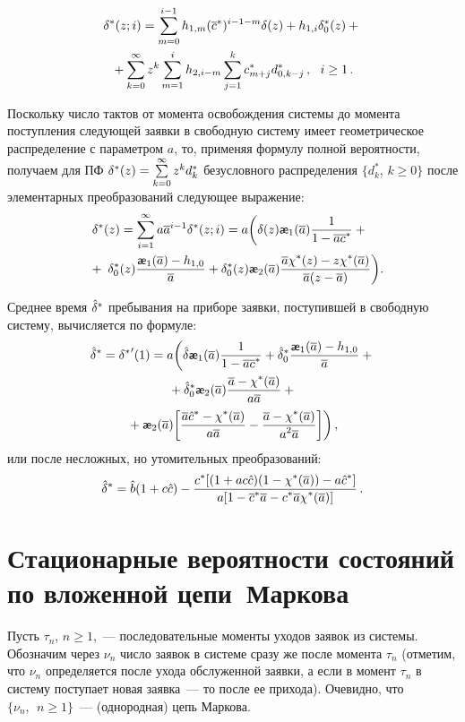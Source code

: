 \begin{multicols}{2}
\noindent
\begin{multline*}
\delta^*(z;i)= \sum_{m=0}^{i-1} h_{1,m} (\overline c^*)^{i-1-m} \delta(z)
+ h_{1,i} \delta^*_{0}(z) +{}\\
{}+ \sum_{k=0}^{\infty} z^k \sum_{m=1}^{i} h_{2,i-m}
\sum_{j=1}^{k} c^*_{m+j} d^*_{0,k-j}\,,
\ \ i\ge 1\,.
\end{multline*}

Поскольку число тактов от момента освобождения сис\-те\-мы до момента
поступления следующей заявки в свободную систему имеет геометрическое
распределение с параметром $a$, то, применяя формулу полной
вероятности, получаем для ПФ
$\delta^{*}(z)\hm=\sum\limits_{k=0}^{\infty} z^{k} d^{*}_k$
безусловного распределения $\{d^{*}_k$, $k\ge 0\}$ после
элементарных преобразований следующее выражение:
\begin{multline*}
\!\!\delta^{*}(z)= \sum_{i=1}^{\infty} a \a^{i-1} \d^{*}(z;i) =
a \bigg( \d(z)
{\slae}_{1}(\a) \fr{1}{1 - \a \oc^*}
+ {}\\
{}+\;\d^*_{0}(z)
\fr{{\slae}_{1}(\a) - h_{1,0} }{\a}
+ \d^*_0(z) {\slae}_{2}(\a)
\fr{\a \chi^*(z) - z \chi^*(\a)}{\a (z-\a)}
\bigg).\!\!\!\!
\end{multline*}

Среднее время $\hat \delta^*$ пребывания на приборе заявки,
поступившей в свободную систему, вычисляется по формуле:
\begin{multline*}
\hd^{*}= {\delta^*}'(1) = a \bigg(
\hd {\slae}_{1}(\a) \fr{1}{1 - \a \oc^*}
+ {\hd^*_{0}}
\fr{{\slae}_{1}(\a) - h_{1,0} }{\a}
+ {}\\
{}+
{\hd^*_0} {\slae}_{2}(\a) \fr{\a - \chi^*(\a) }{a \a}+ {}\\
{}+
{\slae}_{2}(\a) \bigg[ \fr{\a \hc^{*} - \chi^*(\a) }{a \a}-
\fr{\a - \chi^*(\a) }{a^2 \a}\bigg]
\bigg)\,,
\end{multline*}
или после несложных, но утомительных преобразований:
$$
\hat \delta^{*} = \hat b (1 + c \hat c) - \displaystyle\frac{\displaystyle c^* [ (1 + a c\hat c) (1 - \chi^*(\overline a)) - a \hat c^{*}
]\mathstrut}{\displaystyle a[1 - \overline c^* \overline a - c^* \overline a \chi^*(\overline a)]\mathstrut}\,.
$$

\section{Стационарные вероятности состояний по вложенной цепи~Маркова}

Пусть $\tau_{n}$, $n\ge 1$,~--- последовательные моменты
уходов заявок из системы.
Обозначим через $\nu_{n}$ число заявок в системе сразу же после
момента $\tau_{n}$
(отметим, что $\nu_{n}$ определяется после ухода обслуженной
заявки, а если в момент $\tau_{n}$ в систему поступает новая
заявка~--- то после ее прихода).
Очевидно, что $\{\nu_{n},\ \ n\ge 1\}$~--- (однородная)
цепь Маркова.


\end{multicols}
